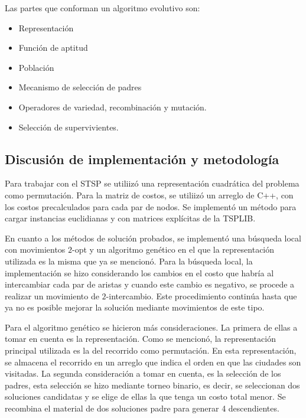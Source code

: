 \par Las partes que conforman un algoritmo evolutivo son:
\begin{itemize}
	\item Representación
	\item Función de aptitud
	\item Población
	\item Mecanismo de selección de padres
	\item Operadores de variedad, recombinación y mutación.
	\item Selección de supervivientes.
\end{itemize}
\subsection*{Discusión de implementación y metodología}
\par Para trabajar con el STSP se utiliizó una representación cuadrática del problema como permutación. Para la matriz de costos, se utiliizó un arreglo de C++, con los costos precalculados para cada par de nodos. Se implementó un método para cargar instancias euclidianas y con matrices explícitas de la TSPLIB.
\par En cuanto a los métodos de solución probados, se implementó una búsqueda local con movimientos $2$-opt y un algoritmo genético en el que la representación utilizada es la misma que ya se mencionó.
Para la búsqueda local, la implementación se hizo considerando los cambios en el costo que habría al intercambiar cada par de aristas y cuando este cambio es negativo, se procede a realizar un movimiento de $2$-intercambio. Este procedimiento continúa hasta que ya no es posible mejorar la solución mediante movimientos de este tipo.
\par Para el algoritmo genético se hicieron más consideraciones. La primera de ellas a tomar en cuenta es la representación. Como se mencionó, la representación principal utilizada es la del recorrido como permutación. En esta representación, se almacena el recorrido en un arreglo que indica el orden en que las ciudades son visitadas. La segunda consideración a tomar en cuenta, es la selección de los padres, esta selección se hizo mediante torneo binario, es decir, se seleccionan dos soluciones candidatas y se elige de ellas la que tenga un costo total menor. Se recombina el material de dos soluciones padre para generar 4 descendientes. 

